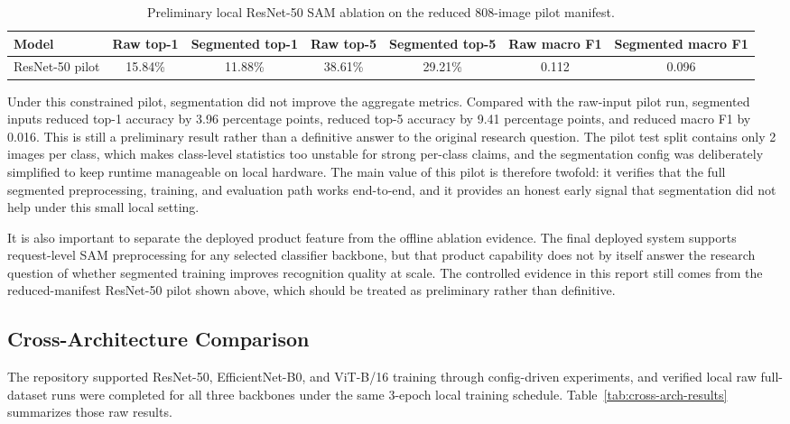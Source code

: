 \documentclass[sigconf,nonacm,11pt]{acmart}
\begin{document}
\begin{table}
  \caption{Preliminary local ResNet-50 SAM ablation on the reduced 808-image pilot manifest.}
  \label{tab:sam-ablation}
  \begin{tabular}{lcccccc}
    \toprule
    Model & Raw top-1 & Segmented top-1 & Raw top-5 & Segmented top-5 & Raw macro F1 & Segmented macro F1 \\
    \midrule
    ResNet-50 pilot & 15.84\% & 11.88\% & 38.61\% & 29.21\% & 0.112 & 0.096 \\
    \bottomrule
  \end{tabular}
\end{table}

Under this constrained pilot, segmentation did not improve the aggregate metrics. Compared with the raw-input pilot run, segmented inputs reduced top-1 accuracy by 3.96 percentage points, reduced top-5 accuracy by 9.41 percentage points, and reduced macro F1 by 0.016. This is still a preliminary result rather than a definitive answer to the original research question. The pilot test split contains only 2 images per class, which makes class-level statistics too unstable for strong per-class claims, and the segmentation config was deliberately simplified to keep runtime manageable on local hardware. The main value of this pilot is therefore twofold: it verifies that the full segmented preprocessing, training, and evaluation path works end-to-end, and it provides an honest early signal that segmentation did not help under this small local setting.

It is also important to separate the deployed product feature from the offline ablation evidence. The final deployed system supports request-level SAM preprocessing for any selected classifier backbone, but that product capability does not by itself answer the research question of whether segmented training improves recognition quality at scale. The controlled evidence in this report still comes from the reduced-manifest ResNet-50 pilot shown above, which should be treated as preliminary rather than definitive.

\subsection{Cross-Architecture Comparison}
The repository supported ResNet-50, EfficientNet-B0, and ViT-B/16 training through config-driven experiments, and verified local raw full-dataset runs were completed for all three backbones under the same 3-epoch local training schedule. Table~\ref{tab:cross-arch-results} summarizes those raw results.
\end{document}
